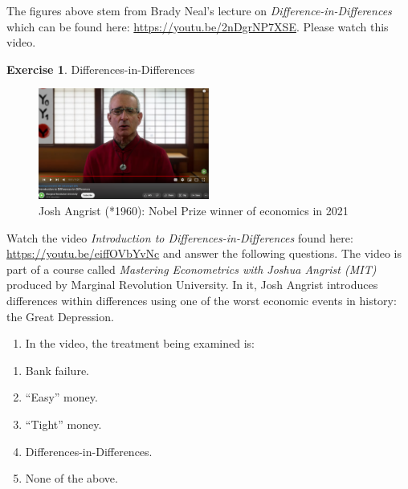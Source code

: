\documentclass[
  12pt,
  oneside]{book}
\providecommand{\tightlist}{%
  \setlength{\itemsep}{0pt}\setlength{\parskip}{0pt}}
\theoremstyle{definition}
\theoremstyle{definition}
\theoremstyle{definition}
\newtheorem{exercise}{Exercise}[chapter]
\theoremstyle{definition}
\theoremstyle{remark}
\begin{document}
The figures above stem from Brady Neal's lecture on \emph{Difference-in-Differences} which can be found here: \url{https://youtu.be/2nDgrNP7XSE}. Please watch this video.

\begin{exercise}
\protect\hypertarget{exr:DiD}{}\label{exr:DiD}Differences-in-Differences

\begin{figure}
\centering
\includegraphics[width=0.5\textwidth,height=\textheight]{fig/angrist-did.png}
\caption[\label{fig:angristdid} Josh Angrist (*1960): Nobel Prize winner of economics in 2021]{\label{fig:angristdid} Josh Angrist (*1960): Nobel Prize winner of economics in 2021\footnotemark{}}
\end{figure}

Watch the video \emph{Introduction to Differences-in-Differences} found here: \url{https://youtu.be/eiffOVbYvNc} and answer the following questions. The video is part of a course called \emph{Mastering Econometrics with Joshua Angrist (MIT)} produced by Marginal Revolution University. In it, Josh Angrist introduces differences within differences using one of the worst economic events in history: the Great Depression.

\begin{enumerate}
\def\labelenumi{\arabic{enumi}.}
\tightlist
\item
  In the video, the treatment being examined is:
\end{enumerate}

\begin{enumerate}
\def\labelenumi{\alph{enumi})}
\tightlist
\item
  Bank failure.
\item
  ``Easy'' money.
\item
  ``Tight'' money.
\item
  Differences-in-Differences.
\item
  None of the above.
\end{enumerate}


\end{exercise}
\end{document}
